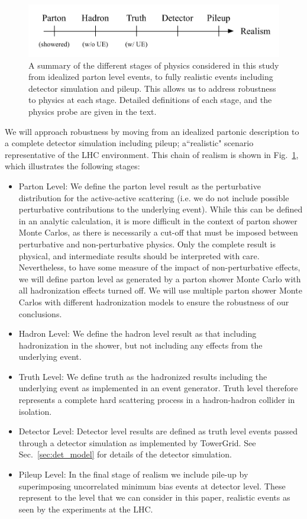 \documentclass[11pt,letterpaper]{article}
\DeclareRobustCommand{\Sec}[1]{Sec.~\ref{#1}}
\DeclareRobustCommand{\Fig}[1]{Fig.~\ref{#1}}
\begin{document}
\begin{figure}[t!]
\begin{center}
\includegraphics[width=0.75\columnwidth]{figures/realism_levels}
\end{center}
\caption{A summary of the different stages of physics considered in this study from idealized parton level events, to fully realistic events including detector simulation and pileup. This allows us to address robustness to physics at each stage. Detailed definitions of each stage, and the physics probe are given in the text.  }
\label{fig:realism}
\end{figure}

We will approach robustness by moving from an idealized partonic description to a complete detector simulation including pileup; a``realistic" scenario representative of the LHC environment. This chain of realism is shown in \Fig{fig:realism}, which illustrates the following stages:
\begin{itemize}
\item Parton Level: We define the parton level result as the perturbative distribution for the active-active scattering (i.e. we do not include possible perturbative contributions to the underlying event). While this can be defined in an analytic calculation, it is more difficult in the context of parton shower Monte Carlos, as there is necessarily a cut-off that must be imposed between perturbative and non-perturbative physics. Only the complete result is physical, and intermediate results should be interpreted with care. Nevertheless, to have some measure of the impact of non-perturbative effects, we will define parton level as generated by a parton shower Monte Carlo with all hadronization effects turned off. We will use multiple parton shower Monte Carlos with different hadronization models to ensure the robustness of our conclusions.
\item Hadron Level: We define the hadron level result as that including hadronization in the shower, but not including any effects from the underlying event.
\item Truth Level: We define truth as the hadronized results including the underlying event as implemented in an event generator. Truth level therefore represents a complete hard scattering process in a hadron-hadron collider in isolation.
\item Detector Level: Detector level results are defined as truth level events passed through a detector simulation as implemented by TowerGrid. See \Sec{sec:det_model} for details of the detector simulation.
\item Pileup Level: In the final stage of realism we include pile-up by superimposing uncorrelated minimum bias events at detector level. These represent to the level that we can consider in this paper, realistic events as seen by the experiments at the LHC.
\end{itemize}
\end{document}
